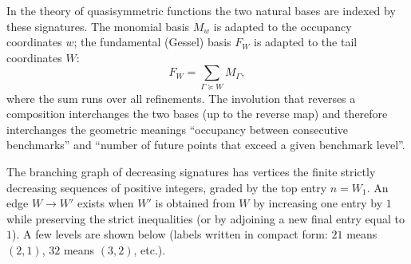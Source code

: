 \documentclass[11pt]{article}
\theoremstyle{plain}
\theoremstyle{definition}
\begin{document}
In the theory of quasisymmetric functions \cite{stanley1972,StanleyEC2,GesselQuasi1984} the two natural bases are indexed by these signatures. The monomial basis \(M_w\) is adapted to the occupancy coordinates \(w\); the fundamental (Gessel) basis \(F_W\) is adapted to the tail coordinates \(W\):
\[
F_W=\sum_{\Gamma\succeq W}M_\Gamma,
\]
where the sum runs over all refinements. The involution that reverses a composition interchanges the two bases (up to the reverse map) and therefore interchanges the geometric meanings ``occupancy between consecutive benchmarks'' and ``number of future points that exceed a given benchmark level''.

The branching graph of decreasing signatures has vertices the finite strictly decreasing sequences of positive integers, graded by the top entry \(n=W_1\). An edge \(W\to W'\) exists when \(W'\) is obtained from \(W\) by increasing one entry by \(1\) while preserving the strict inequalities (or by adjoining a new final entry equal to \(1\)). A few levels are shown below (labels written in compact form: \(21\) means \((2,1)\), \(32\) means \((3,2)\), etc.).

\begin{center}
\end{center}

\end{document}

